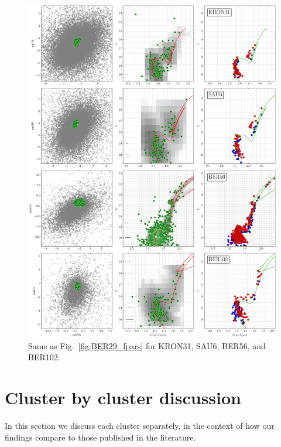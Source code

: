 \documentclass[draft]{aa}
\begin{document}
\begin{appendix}
 \begin{figure}
  \centering
  \includegraphics[height=.95\textheight]{figs/20_fpars.png}
  \caption{Same as Fig.~\ref{fig:BER29_fpars} for KRON31, SAU6, BER56, and BER102.}
  \label{fig:20fpars}
 \end{figure}


\FloatBarrier
\section{Cluster by cluster discussion}
 \label{app:indiv_clusters}

  In this section we discuss each cluster separately, in the context of how our
  findings compare to those published in the literature.\\


\end{appendix}
\end{document}
